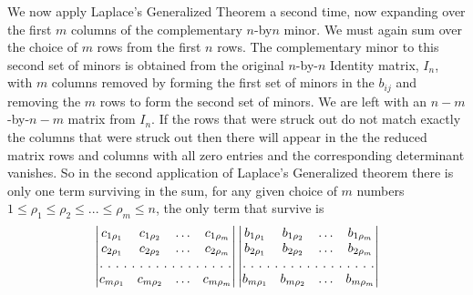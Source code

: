We now apply Laplace's Generalized Theorem a second time, now expanding over the first $m$ columns of the complementary $n$-by$n$ minor. We must again sum over the choice of $m$ rows from the first $n$ rows. The complementary minor to this second set of minors is obtained from the original $n$-by-$n$ Identity matrix, $I_n$, with $m$ columns removed by forming the first set of minors in the $b_{ij} $ and removing the $m$ rows to form the second set of minors. We are left with an $n-m$-by-$n-m$ matrix from $I_{n}$. If the rows that were struck out do not match exactly the columns that were struck out then there will appear in the the reduced matrix rows and columns with all zero entries and the corresponding determinant vanishes. So in the second application of Laplace's Generalized theorem there is only one term surviving in the sum, for any given choice of $m$ numbers 
$1 \le \rho_1 \le \rho_2 \le  ...\le \rho_m \le n$, the only term that survive is 
\begin{equation}
\begin{vmatrix}
c_{1\rho_1} & c_{1\rho_2}  & \hdots & c_{1\rho_m}  \\
c_{2\rho_1} & c_{2\rho_2}  & \hdots & c_{2\rho_m}  \\
\hdotsfor[2]{4}\\
c_{m\rho_1} & c_{m\rho_2}  & \hdots & c_{m\rho_m}  \\
\end{vmatrix}
\begin{vmatrix}
b_{1\rho_1} & b_{1\rho_2}  & \hdots & b_{1\rho_m}  \\
b_{2\rho_1} & b_{2\rho_2}  & \hdots & b_{2\rho_m}  \\
\hdotsfor[2]{4}\\
b_{m\rho_1} & b_{m\rho_2}  & \hdots & b_{m\rho_m}  \\
\end{vmatrix}
\end{equation}

